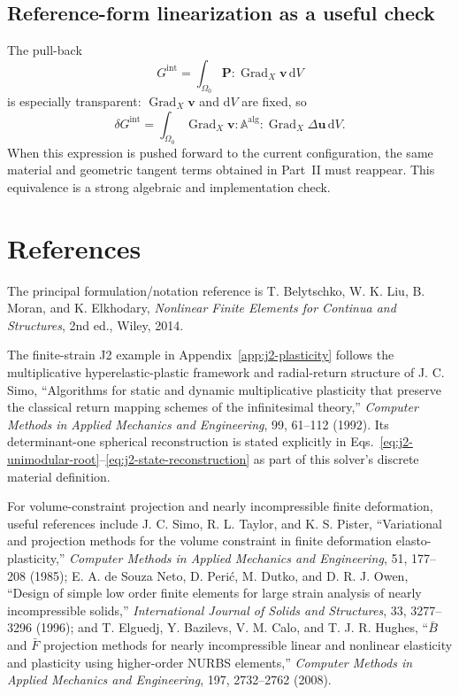 \documentclass[11pt,a4paper]{article}
\newcommand{\bs}[1]{\boldsymbol{#1}}
\newcommand{\dd}{\mathrm{d}}
\newcommand{\Grad}{\operatorname{Grad}}
\begin{document}
\subsection{Reference-form linearization as a useful check}
The pull-back
\begin{equation}
G^{\mathrm{int}}=\int_{\Omega_0}\bs P:\Grad_X\bs v\,\dd V
\end{equation}
is especially transparent: $\Grad_X\bs v$ and $\dd V$ are fixed, so
\begin{equation}
\delta G^{\mathrm{int}}
=
\int_{\Omega_0}
\Grad_X\bs v:\mathbb A^{\mathrm{alg}}:\Grad_X\Delta\bs u\,\dd V.
\end{equation}
When this expression is pushed forward to the current configuration, the same material and geometric tangent terms obtained in Part~II must reappear. This equivalence is a strong algebraic and implementation check.

\section{References}

The principal formulation/notation reference is T. Belytschko, W. K. Liu, B. Moran, and K. Elkhodary, \emph{Nonlinear Finite Elements for Continua and Structures}, 2nd ed., Wiley, 2014.

The finite-strain J2 example in Appendix~\ref{app:j2-plasticity} follows the multiplicative hyperelastic-plastic framework and radial-return structure of J. C. Simo, ``Algorithms for static and dynamic multiplicative plasticity that preserve the classical return mapping schemes of the infinitesimal theory,'' \emph{Computer Methods in Applied Mechanics and Engineering}, 99, 61--112 (1992).  Its determinant-one spherical reconstruction is stated explicitly in Eqs.~\eqref{eq:j2-unimodular-root}--\eqref{eq:j2-state-reconstruction} as part of this solver's discrete material definition.

For volume-constraint projection and nearly incompressible finite deformation, useful references include J. C. Simo, R. L. Taylor, and K. S. Pister, ``Variational and projection methods for the volume constraint in finite deformation elasto-plasticity,'' \emph{Computer Methods in Applied Mechanics and Engineering}, 51, 177--208 (1985); E. A. de Souza Neto, D. Peri\'{c}, M. Dutko, and D. R. J. Owen, ``Design of simple low order finite elements for large strain analysis of nearly incompressible solids,'' \emph{International Journal of Solids and Structures}, 33, 3277--3296 (1996); and T. Elguedj, Y. Bazilevs, V. M. Calo, and T. J. R. Hughes, ``$\bar B$ and $\bar F$ projection methods for nearly incompressible linear and nonlinear elasticity and plasticity using higher-order NURBS elements,'' \emph{Computer Methods in Applied Mechanics and Engineering}, 197, 2732--2762 (2008).
\end{document}
